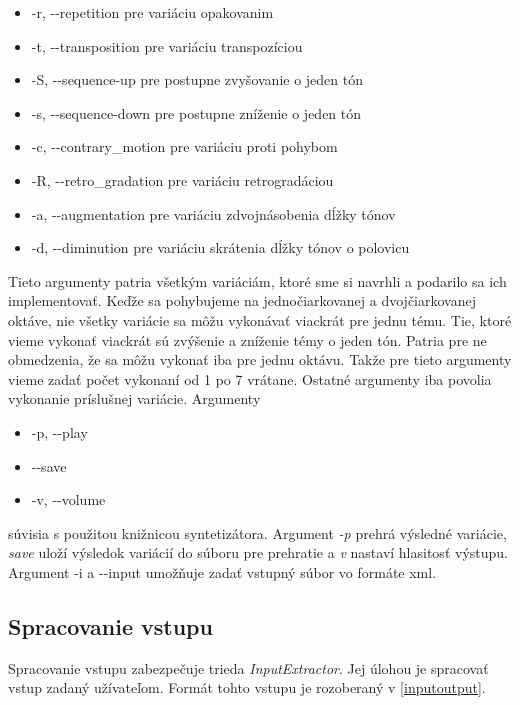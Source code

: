 \begin{itemize}\itemsep0.05em
    \item -r, -{}-repetition pre variáciu opakovanim
    \item -t, -{}-transposition pre variáciu transpozíciou
    \item -S, -{}-sequence-up pre postupne zvyšovanie o jeden tón
    \item -s, -{}-sequence-down pre postupne zníženie o jeden tón
    \item -c, -{}-contrary\_motion pre variáciu proti pohybom
    \item -R, -{}-retro\_gradation pre variáciu retrogradáciou
    \item -a, -{}-augmentation pre variáciu zdvojnásobenia dĺžky tónov
    \item -d, -{}-diminution pre variáciu skrátenia dĺžky tónov o polovicu
\end{itemize}

Tieto argumenty patria všetkým variáciám, ktoré sme si navrhli a podarilo sa ich implementovať. Keďže sa pohybujeme na jednočiarkovanej a dvojčiarkovanej oktáve, nie všetky variácie sa môžu vykonávať viackrát pre jednu tému. Tie, ktoré vieme vykonať viackrát sú zvýšenie a zníženie témy o jeden tón. Patria pre ne obmedzenia, že sa môžu vykonať iba pre jednu oktávu. Takže pre tieto argumenty vieme zadať počet vykonaní od 1 po 7 vrátane. Ostatné argumenty iba povolia vykonanie príslušnej variácie. Argumenty

\begin{itemize}\itemsep0.05em
    \item -p, -{}-play 
    \item -{}-save
    \item -v, -{}-volume
\end{itemize}

súvisia s použitou knižnicou syntetizátora. Argument \textit{-p} prehrá výsledné variácie, \textit{save} uloží výsledok variácií do súboru pre prehratie a \textit{v} nastaví hlasitosť výstupu. Argument -i a -{}-input umožňuje zadať vstupný súbor vo formáte xml.

\subsection{Spracovanie vstupu}
Spracovanie vstupu zabezpečuje trieda \textit{InputExtractor}. Jej úlohou je spracovať vstup zadaný užívateľom. Formát tohto vstupu je rozoberaný v \ref{inputoutput}. 


